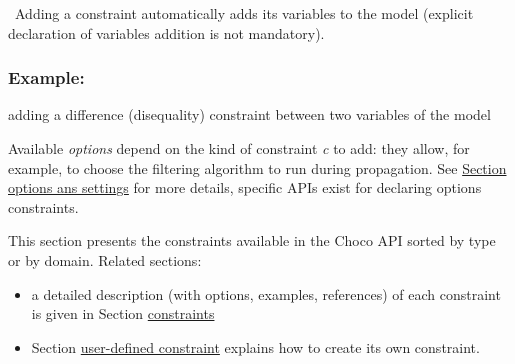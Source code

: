 

\begin{note}\
Adding a constraint automatically adds its variables to the model (explicit declaration of variables addition is not mandatory).
\end{note}


\subsubsection{Example:} adding a difference (disequality) constraint between two variables of the model



Available \emph{options} depend on the kind of constraint \emph{c} to add: they allow, for example, to choose the filtering algorithm to run during propagation. See \hyperlink{optionssettings}{Section options ans settings} for more details, specific APIs exist for declaring options constraints.

This section presents the constraints available in the Choco API sorted by type or by domain. Related sections:
\begin{itemize}
\item a detailed description (with options, examples, references) of each constraint is given in Section \hyperlink{ch:constraints}{constraints}
\item Section \hyperlink{advanced:defineyourownconstraint}{user-defined constraint} explains how to create its own constraint.
\end{itemize}


